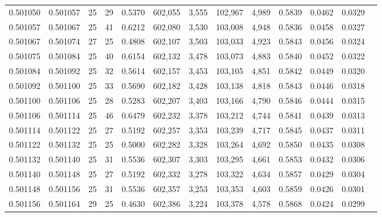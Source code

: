 \begin{tabular}{rrrrrrrrrrrrr}
0.501050 & 0.501057 &    25 &  29 &                                     0.5370 & 602,055 &   3,555 & 102,967 &   4,989 & 0.5839 & 0.0462 & 0.0329 \\
0.501057 & 0.501067 &    25 &  41 &                                     0.6212 & 602,080 &   3,530 & 103,008 &   4,948 & 0.5836 & 0.0458 & 0.0327 \\
0.501067 & 0.501074 &    27 &  25 &                                     0.4808 & 602,107 &   3,503 & 103,033 &   4,923 & 0.5843 & 0.0456 & 0.0324 \\
0.501075 & 0.501084 &    25 &  40 &                                     0.6154 & 602,132 &   3,478 & 103,073 &   4,883 & 0.5840 & 0.0452 & 0.0322 \\
0.501084 & 0.501092 &    25 &  32 &                                     0.5614 & 602,157 &   3,453 & 103,105 &   4,851 & 0.5842 & 0.0449 & 0.0320 \\
0.501092 & 0.501100 &    25 &  33 &                                     0.5690 & 602,182 &   3,428 & 103,138 &   4,818 & 0.5843 & 0.0446 & 0.0318 \\
0.501100 & 0.501106 &    25 &  28 &                                     0.5283 & 602,207 &   3,403 & 103,166 &   4,790 & 0.5846 & 0.0444 & 0.0315 \\
0.501106 & 0.501114 &    25 &  46 &                                     0.6479 & 602,232 &   3,378 & 103,212 &   4,744 & 0.5841 & 0.0439 & 0.0313 \\
0.501114 & 0.501122 &    25 &  27 &                                     0.5192 & 602,257 &   3,353 & 103,239 &   4,717 & 0.5845 & 0.0437 & 0.0311 \\
0.501122 & 0.501132 &    25 &  25 &                                     0.5000 & 602,282 &   3,328 & 103,264 &   4,692 & 0.5850 & 0.0435 & 0.0308 \\
0.501132 & 0.501140 &    25 &  31 &                                     0.5536 & 602,307 &   3,303 & 103,295 &   4,661 & 0.5853 & 0.0432 & 0.0306 \\
0.501140 & 0.501148 &    25 &  27 &                                     0.5192 & 602,332 &   3,278 & 103,322 &   4,634 & 0.5857 & 0.0429 & 0.0304 \\
0.501148 & 0.501156 &    25 &  31 &                                     0.5536 & 602,357 &   3,253 & 103,353 &   4,603 & 0.5859 & 0.0426 & 0.0301 \\
0.501156 & 0.501164 &    29 &  25 &                                     0.4630 & 602,386 &   3,224 & 103,378 &   4,578 & 0.5868 & 0.0424 & 0.0299 \\

\end{tabular}
